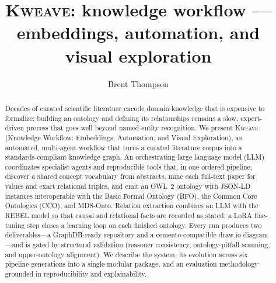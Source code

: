 \documentclass[Afour,sageh,times]{sagej}
\begin{document}

\title{\textsc{Kweave}: knowledge workflow --- embeddings, automation, and visual exploration}

\author{Brent Thompson}




\begin{abstract}
Decades of curated scientific literature encode domain knowledge that is expensive to
formalize: building an ontology and defining its relationships remains a slow, expert-driven
process that goes well beyond named-entity recognition. We present \textsc{Kweave}
(Knowledge Workflow: Embeddings, Automation, and Visual Exploration), an automated, multi-agent
workflow that turns a curated literature corpus into a standards-compliant knowledge graph.
An orchestrating large language model (LLM) coordinates specialist agents and reproducible
tools that, in one ordered pipeline, discover a shared concept vocabulary from abstracts,
mine each full-text paper for values and exact relational triples, and emit an OWL~2 ontology
with JSON-LD instances interoperable with the Basic Formal Ontology (BFO), the Common Core
Ontologies (CCO), and MDS-Onto. Relation extraction combines an LLM with the REBEL model so
that causal and relational facts are recorded as stated; a LoRA fine-tuning step closes a
learning loop on each finished ontology. Every run produces two deliverables---a GraphDB-ready
repository and a cemento-compatible draw.io diagram---and is gated by structural validation
(reasoner consistency, ontology-pitfall scanning, and upper-ontology alignment). We describe
the system, its evolution across six pipeline generations into a single modular package, and an
evaluation methodology grounded in reproducibility and explainability.
\end{abstract}


\maketitle
\end{document}
